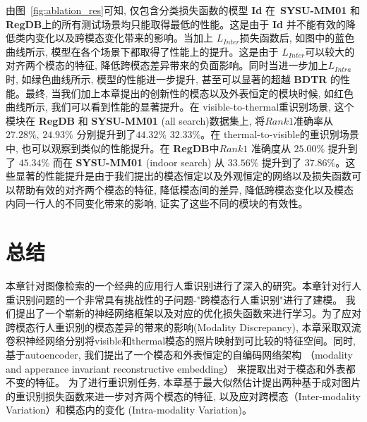 由图~\ref{fig:ablation_res}可知, 仅包含分类损失函数的模型 \textbf{Id} 在~\textbf{SYSU-MM01} 和 \textbf{RegDB}上的所有测试场景均只能取得最低的性能。这是由于 \textbf{Id} 并不能有效的降低类内变化以及跨模态变化带来的影响。当加上 $L_{Inter}$损失函数后, 如图中的蓝色曲线所示, 模型在各个场景下都取得了性能上的提升。这是由于 $L_{Inter}$可以较大的对齐两个模态的特征, 降低跨模态差异带来的负面影响。同时当进一步加上$L_{Intra}$时, 如绿色曲线所示, 模型的性能进一步提升, 甚至可以显著的超越 \textbf{BDTR} 的性能。最终, 当我们加上本章提出的创新性的模态以及外表恒定的模块时候, 如红色曲线所示, 我们可以看到性能的显著提升。在 visible-to-thermal重识别场景, 这个模块在 \textbf{RegDB} 和 \textbf{SYSU-MM01} (all search)数据集上, 将$Rank1$准确率从$27.28 \%$, $24.93 \%$ 分别提升到了$44.32\%$ $32.33 \%$。在 thermal-to-visible的重识别场景中, 也可以观察到类似的性能提升。在 \textbf{RegDB}中$Rank1$ 准确度从 $25.00 \%$ 提升到了 $45.34 \%$ 而在 \textbf{SYSU-MM01} (indoor search) 从 $33.56 \%$ 提升到了 $37.86 \%$。这些显著的性能提升是由于我们提出的模态恒定以及外观恒定的网络以及损失函数可以帮助有效的对齐两个模态的特征, 降低模态间的差异, 降低跨模态变化以及模态内同一行人的不同变化带来的影响, 证实了这些不同的模块的有效性。

\section{总结}
本章针对图像检索的一个经典的应用行人重识别进行了深入的研究。本章针对行人重识别问题的一个非常具有挑战性的子问题-"跨模态行人重识别"进行了建模。 我们提出了一个崭新的神经网络框架以及对应的优化损失函数来进行学习。为了应对跨模态行人重识别的模态差异的带来的影响(Modality Discrepancy), 本章采取双流卷积神经网络分别将visible和thermal模态的照片映射到可比较的特征空间。同时, 基于autoencoder, 我们提出了一个模态和外表恒定的自编码网络架构 （modality and apperance invariant reconstructive embedding） 来提取出对于模态和外表都不变的特征。 为了进行重识别任务, 本章基于最大似然估计提出两种基于成对图片的重识别损失函数来进一步对齐两个模态的特征, 以及应对跨模态（Inter-modality Variation）和模态内的变化 (Intra-modality Variation)。